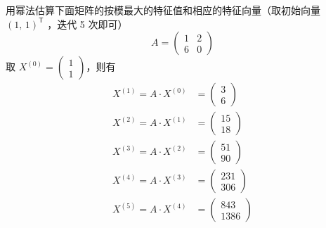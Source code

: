 \documentclass[11pt]{article}
\begin{document}
\maketitle

\thispagestyle{empty}

\newpage

\begin{question}

    \questiontext
    {
        用幂法估算下面矩阵的按模最大的特征值和相应的特征向量（取初始向量 $(1,\,1)^\mathsf{T}$ ，迭代 5 次即可）
        \begin{equation*}
            A = \begin{pmatrix}
                1 & 2 \\
                6 & 0
            \end{pmatrix}
        \end{equation*}
    }
    \answer
    {
    取 $X^{(0)} = \begin{pmatrix}
            1 \\
            1
        \end{pmatrix}$，则有
    \begin{align*}
        X^{(1)} = A \cdot X^{(0)} & =
        \begin{pmatrix}
            3 \\
            6
        \end{pmatrix}     \\
        X^{(2)} = A \cdot X^{(1)} & =
        \begin{pmatrix}
            15 \\
            18
        \end{pmatrix}     \\
        X^{(3)} = A \cdot X^{(2)} & =
        \begin{pmatrix}
            51 \\
            90
        \end{pmatrix}     \\
        X^{(4)} = A \cdot X^{(3)} & =
        \begin{pmatrix}
            231 \\
            306
        \end{pmatrix}     \\
        X^{(5)} = A \cdot X^{(4)} & =
        \begin{pmatrix}
            843 \\
            1386
        \end{pmatrix}
    \end{align*}
}
\end{question}
\end{document}

